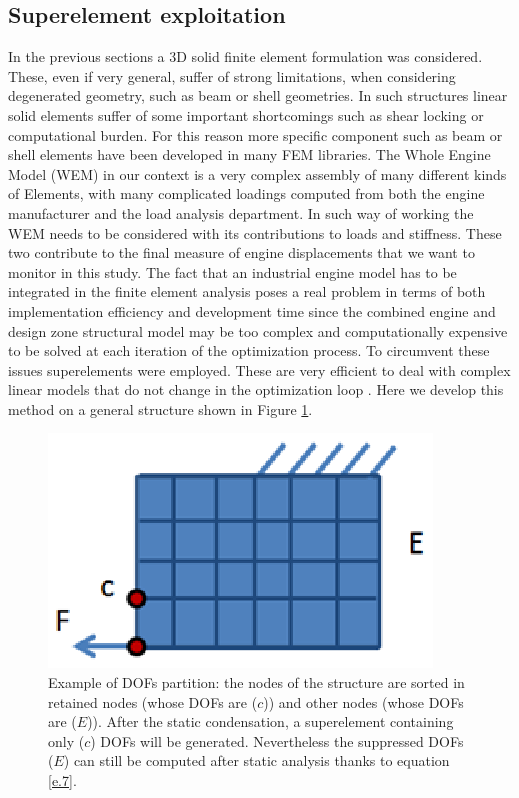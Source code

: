 \subsection{Superelement exploitation}
\label{subsection1.4.1}
In the previous sections a 3D solid finite element formulation was considered. These, even if very general, suffer of strong limitations, when considering degenerated geometry, such as beam or shell geometries. In such structures linear solid elements suffer of some important shortcomings such as shear locking or computational burden. For this reason more specific component such as beam or shell elements have been developed in many FEM libraries. The Whole Engine Model (WEM) in our context is a very complex assembly of many different kinds of Elements, with many complicated loadings computed from both the engine manufacturer and the load analysis department. In such way of working the WEM needs to be considered with its contributions to loads and stiffness. These two contribute to the final measure of engine displacements that we want to monitor in this study.  The fact that an industrial engine model has to be integrated in the finite element analysis poses a real problem in terms of both implementation efficiency and development time since the combined engine and design zone structural model may be too complex and computationally expensive to be solved at each iteration of the optimization process. To circumvent these issues superelements \cite{nastran2013superelements} were employed. These are very efficient to deal with complex linear models that do not change in the optimization loop \cite{krog2004topology}.
Here we develop this method on a general structure shown in Figure \ref{f.3}.
\begin{figure}[hbt!]
\centering
\includegraphics[width=.4\textwidth]{images/Ch1/dof_part.eps}
\caption{Example of DOFs partition: the nodes of the structure are sorted in retained nodes (whose DOFs are ($c$)) and other nodes (whose  DOFs are ($E$)). After the static condensation, a superelement containing only ($c$) DOFs will be generated. Nevertheless the suppressed DOFs ($E$) can still be computed after static analysis thanks to equation \ref{e.7}.  \label{f.3}}
\end{figure}
